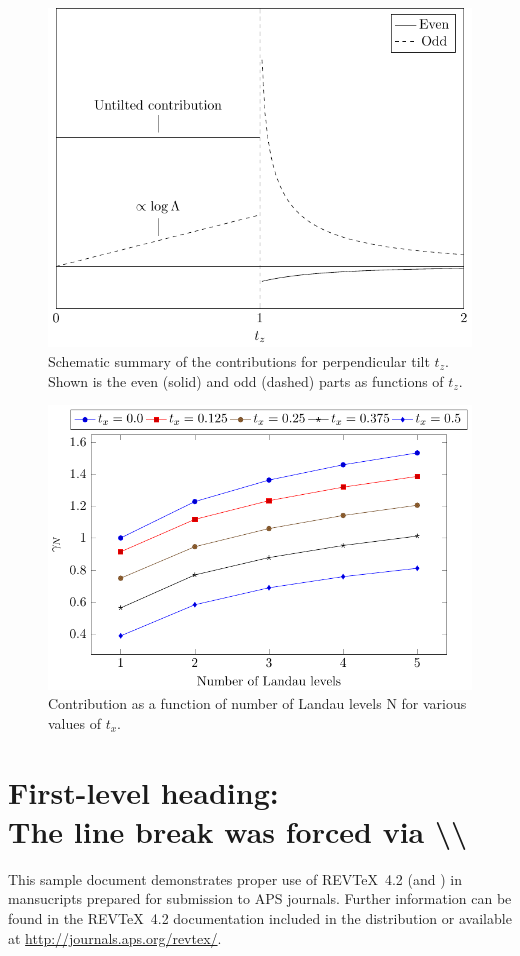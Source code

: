 \documentclass[%
 reprint,
 amsmath,amssymb,
 aps,
]{revtex4-2}
\begin{document}
\begin{figure}[t]
  \centering
  \includegraphics[width=.8\columnwidth]{figures/schematic_tz}
  \caption{Schematic summary of the contributions for perpendicular tilt \(t_z \). Shown is the even (solid) and odd (dashed) parts as functions of \(t_z\).}
  \label{fig:schematic_tz}
\end{figure}

\begin{figure}[t]
  \centering
  \includegraphics[width=.7\columnwidth]{figures/contribtx}
  \caption{Contribution as a function of number of Landau levels N for various values of \(t_x\).}
\end{figure}


\section{\label{sec:level1}First-level heading:\protect\\ The line
break was forced \lowercase{via} \textbackslash\textbackslash}

This sample document demonstrates proper use of REV\TeX~4.2 (and
\LaTeXe) in mansucripts prepared for submission to APS
journals. Further information can be found in the REV\TeX~4.2
documentation included in the distribution or available at
\url{http://journals.aps.org/revtex/}.
\end{document}
